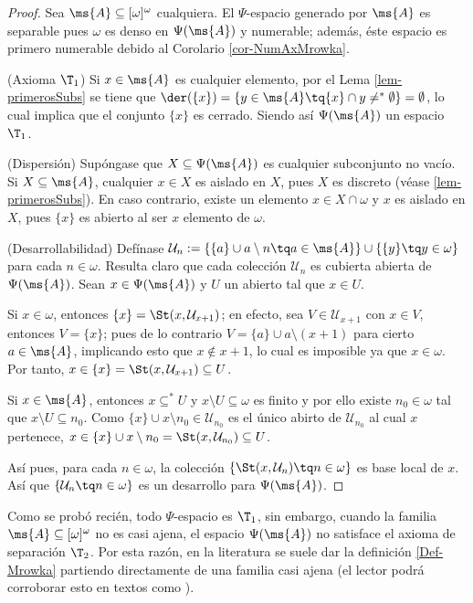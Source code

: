 	\begin{proof} 
		Sea $\ms{A} \subseteq [\omega]^\omega$ cualquiera. El $\Psi$-espacio generado por $\ms{A}$ es separable pues $\omega$ es denso en $\Psi(\ms{A})$ y numerable; además, éste espacio es primero numerable debido al Corolario \ref{cor-NumAxMrowka}.
	
		(Axioma $\T_1$) Si $x \in \ms{A}$ es cualquier elemento, por el Lema \ref{lem-primerosSubs} se tiene que $\der(\{x\})=\{y \in \ms{A} \tq \{x\} \cap y \neq^* \emptyset \}=\emptyset$, lo cual implica que el conjunto $\{x\}$ es cerrado. Siendo así $\Psi(\ms{A})$ un espacio $\T_1$.
		
		(Dispersión) Supóngase que $X \subseteq \Psi(\ms{A})$ es cualquier subconjunto no vacío. Si $X \subseteq \ms{A}$, cualquier $x \in X$ es aislado en $X$, pues $X$ es discreto (véase \ref{lem-primerosSubs}). En caso contrario, existe un elemento $x \in X \cap \omega$ y $x$ es aislado en $X$, pues $\{x\}$ es abierto al ser $x$ elemento de $\omega$.
		
		(Desarrollabilidad) Defínase $\mathcal{U}_n:=\{ \{a\} \cup a \setminus n \tq a \in \ms{A} \} \cup \{ \{y\} \tq y \in \omega \}$ para cada $n \in \omega$. Resulta claro que cada colección $\mathcal{U}_n$ es cubierta abierta de $\Psi(\ms{A})$. Sean $x \in \Psi(\ms{A})$ y $U$ un abierto tal que $x \in U$.
		
		Si $x \in \omega$, entonces $\{x\} = \St(x, \mathcal{U}_{x+1})$; en efecto, sea $V \in \mathcal{U}_{x+1}$ con $x \in V$, entonces $V=\{x\}$; pues de lo contrario $V =\{a\} \cup a \setminus (x+1)$ para cierto $a \in \ms{A}$, implicando esto que $x \notin x+1$, lo cual es imposible ya que $x \in \omega$. Por tanto, $x \in \{x\} = \St(x,\mathcal{U}_{x+1}) \subseteq U$. 
		
		Si $x \in \ms{A}$, entonces $x \subseteq^* U$ y $x \setminus U \subseteq \omega$ es finito y por ello existe $n_0 \in \omega$ tal que $x \setminus U \subseteq n_0$. Como $\{x\} \cup x \setminus n_0 \in \mathcal{U}_{n_0}$ es el único abirto de $\mathcal{U}_{n_0}$ al cual $x$ pertenece, $x \in \{x\} \cup x \setminus n_0 = \St(x, \mathcal{U}_{n_0}) \subseteq U$.
		
		Así pues, para cada $n \in \omega$, la colección $\{\St(x, \mathcal{U}_n) \tq n \in \omega\}$ es base local de $x$. Así que $\{\mathcal{U}_n \tq n \in \omega \}$ es un desarrollo para $\Psi(\ms{A})$.
	\end{proof}
	
	Como se probó recién, todo $\Psi$-espacio es $\T_1$, sin embargo, cuando la familia $\ms{A} \subseteq [\omega]^\omega$ no es casi ajena, el espacio $\Psi(\ms{A})$ no satisface el axioma de separación $\T_2$. Por esta razón, en la literatura se suele dar la definición \ref{Def-Mrowka} partiendo directamente de una familia casi ajena (el lector podrá corroborar esto en textos como \cite{hruMrowka,hruAlmost,kannanHereditarily}).
	
